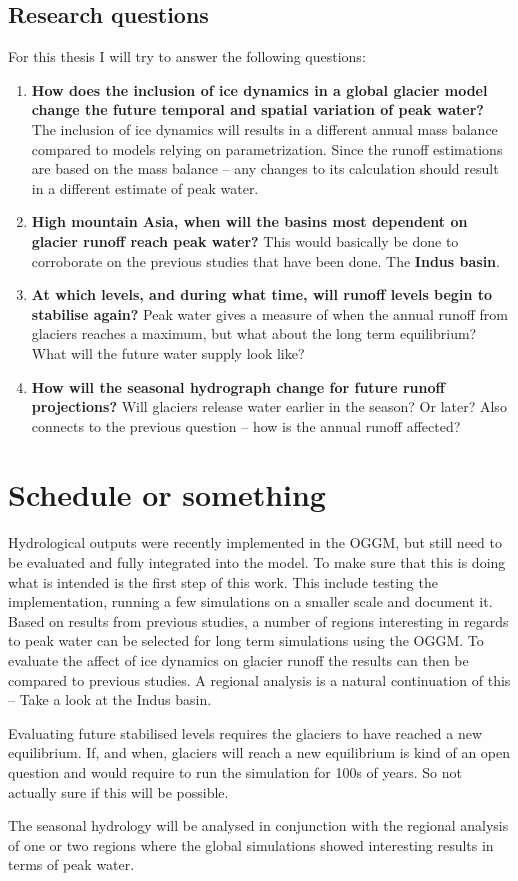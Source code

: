 \documentclass[12pt, a4paper]{article}
\begin{document}
\subsection{Research questions}
For this thesis I will try to answer the following questions:
\begin{enumerate}
    \item \textbf{How does the inclusion of ice dynamics in a global glacier
    model change the future temporal and spatial variation of peak water?}
    The inclusion of ice dynamics will results in a different annual mass
    balance compared to models relying on parametrization. Since the runoff
    estimations are based on the mass balance -- any changes to its calculation
    should result in a different estimate of peak water.
    \item \textbf{High mountain Asia, when will the basins most dependent on
    glacier runoff reach peak water?} This would basically be done to
    corroborate on the previous studies that have been done. The \textbf{Indus
    basin}.
    \item \textbf{At which levels, and during what time, will runoff levels
    begin to stabilise again?} Peak water gives a measure of when the annual
    runoff from glaciers reaches a maximum, but what about the long term
    equilibrium? What will the future water supply look like?
    \item \textbf{How will the seasonal hydrograph change for future runoff
    projections?} Will glaciers release water earlier in the season? Or later?
    Also connects to the previous question -- how is the annual runoff affected?
\end{enumerate}

\section{Schedule or something}
Hydrological outputs were recently implemented in the OGGM, but still need to be
evaluated and fully integrated into the model. To make sure that this is doing
what is intended is the first step of this work. This include testing the
implementation, running a few simulations on a smaller scale and document it.
Based on results from previous studies, a number of regions interesting in
regards to peak water can be selected for long term simulations using the OGGM.
To evaluate the affect of ice dynamics on glacier runoff the results can then
be compared to previous studies. A regional analysis is a natural continuation
of this -- Take a look at the Indus basin.

Evaluating future stabilised levels requires the glaciers to have reached a new
equilibrium. If, and when, glaciers will reach a new equilibrium is kind of an
open question and would require to run the simulation for 100s of years. So not
actually sure if this will be possible.

The seasonal hydrology will be analysed in conjunction with the regional
analysis of one or two regions where the global simulations showed interesting
results in terms of peak water.




\printbibliography
\end{document}
